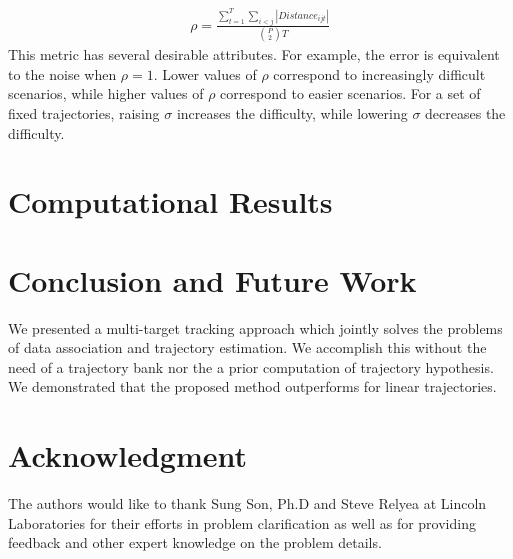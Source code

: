 \documentclass[journal]{IEEEtran}
\begin{document}
\begin{align}
\rho = \frac{\sum\limits_{t=1}^{T}\sum\limits_{i<j}|Distance_{ijt}|}{\binom{P}{2}T}
\end{align}
This metric has several desirable attributes. For example, the error is equivalent to the noise when $\rho = 1$.  Lower values of $\rho$ correspond to increasingly difficult scenarios, while higher values of $\rho$ correspond to easier scenarios. For a set of fixed trajectories, raising $\sigma$ increases the difficulty, while lowering $\sigma$ decreases the difficulty. 


\section{Computational Results}


\section{Conclusion and Future Work}
We presented a multi-target tracking approach which jointly solves the problems of data association and trajectory estimation. We accomplish this without the need of a trajectory bank nor the a prior computation of trajectory hypothesis. We demonstrated that the proposed method outperforms for linear trajectories.

\section*{Acknowledgment}
The authors would like to thank Sung Son, Ph.D and Steve Relyea at Lincoln Laboratories for their efforts in problem clarification as well as for providing feedback and other expert knowledge on the problem details. 





\nocite{*}


%

\end{document}
